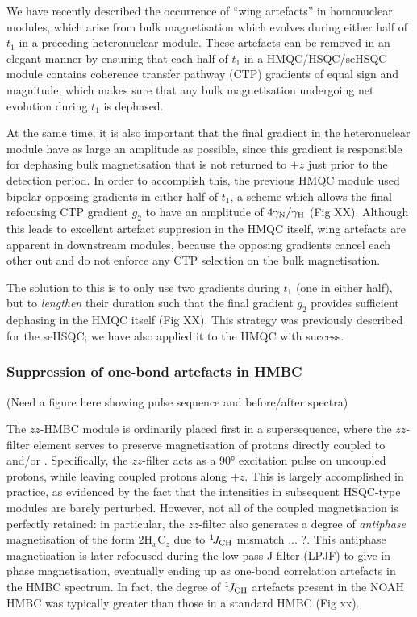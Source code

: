 \documentclass[a4paper,11pt]{article}
\newcommand{\carbon}{\ce{^{13}C}}
\newcommand{\nitrogen}{\ce{^{15}N}}
\newcommand{\todo}[1]{\textcolor{WildStrawberry}{#1}}
\newcommand{\onejch}{{}^1\!J_{\ce{CH}}}
\begin{document}
We have recently described the occurrence of ``wing artefacts'' in homonuclear modules, which arise from bulk magnetisation which evolves during either half of $t_1$ in a preceding heteronuclear module.\autocite{Yong2021JMR}
These artefacts can be removed in an elegant manner by ensuring that each half of $t_1$ in a HMQC/HSQC/seHSQC module contains coherence transfer pathway (CTP) gradients of equal sign and magnitude, which makes sure that any bulk magnetisation undergoing net evolution during $t_1$ is dephased.

At the same time, it is also important that the final gradient in the heteronuclear module have as large an amplitude as possible, since this gradient is responsible for dephasing bulk magnetisation that is not returned to $+z$ just prior to the detection period.
In order to accomplish this, the previous \nitrogen{} HMQC module used bipolar opposing gradients in either half of $t_1$, a scheme which allows the final refocusing CTP gradient $g_2$ to have an amplitude of $4\gamma_{\ce{N}} / \gamma_{\ce{H}}$ (\todo{Fig XX}).
Although this leads to excellent artefact suppresion in the \nitrogen{} HMQC itself, wing artefacts are apparent in downstream modules, because the opposing gradients cancel each other out and do not enforce any CTP selection on the bulk magnetisation.

The solution to this is to only use two gradients during $t_1$ (one in either half), but to \textit{lengthen} their duration such that the final gradient $g_2$ provides sufficient dephasing in the HMQC itself (\todo{Fig XX}).
This strategy was previously described for the \nitrogen{} seHSQC;\autocite{Yong2021JMR} we have also applied it to the HMQC with success.

\subsubsection{Suppression of one-bond artefacts in HMBC}

\todo{(Need a figure here showing pulse sequence and before/after spectra)}

The $zz$-HMBC module is ordinarily placed first in a supersequence, where the $zz$-filter element serves to preserve magnetisation of protons directly coupled to \carbon{} and/or \nitrogen{}.\autocite{Kupce2018CC,Kupce2019JMR}
Specifically, the $zz$-filter acts as a \ang{90} excitation pulse on uncoupled protons, while leaving coupled protons along $+z$.
This is largely accomplished in practice, as evidenced by the fact that the intensities in subsequent HSQC-type modules are barely perturbed.
However, not all of the coupled magnetisation is perfectly retained: in particular, the $zz$-filter also generates a degree of \textit{antiphase} magnetisation of the form $2\mathrm{H}_x\mathrm{C}_z$ \todo{due to $\onejch{}$ mismatch ... ?}.
This antiphase magnetisation is later refocused during the low-pass J-filter (LPJF) to give in-phase magnetisation, eventually ending up as one-bond correlation artefacts in the HMBC spectrum.
In fact, the degree of $\onejch$ artefacts present in the NOAH HMBC was typically greater than those in a standard HMBC (\todo{Fig xx}).
\end{document}
